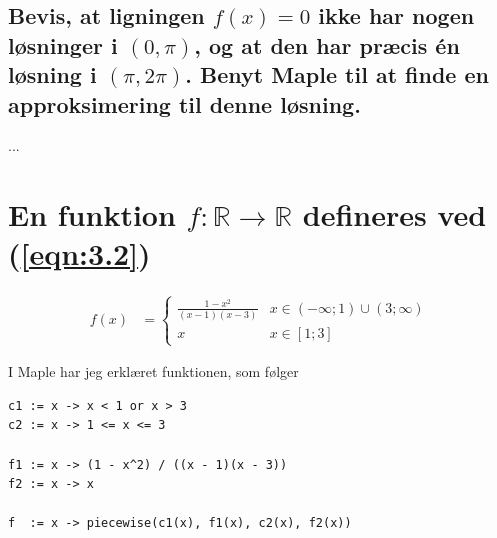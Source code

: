 \documentclass[11pt,a4paper]{article}
\newcommand{\eqnref}[1]{(\ref{eqn:#1})}
\begin{document}
\subsection
{
    \mdseries
    Bevis, at ligningen $f(x) = 0$ ikke har nogen løsninger i $(0, \pi)$, og
    at den har præcis én løsning i $(\pi,2\pi)$. Benyt Maple til at finde en
    approksimering til denne løsning.
}
...


\section
{
    \mdseries
    En funktion $f : \mathbb{R} \rightarrow \mathbb{R}$ defineres ved
    \eqnref{3.2}
}
\begin{align}
    f(x) &=
    \begin{cases}
        \frac{1 - x^2}{(x -1)(x - 3)} &x \in (-\infty;1) \cup (3;\infty) \\
        x &x \in [1;3]
    \end{cases}
    \label{eqn:3.2}
\end{align}

I Maple har jeg erklæret funktionen, som følger
\begin{lstlisting}
c1 := x -> x < 1 or x > 3
c2 := x -> 1 <= x <= 3

f1 := x -> (1 - x^2) / ((x - 1)(x - 3))
f2 := x -> x

f  := x -> piecewise(c1(x), f1(x), c2(x), f2(x))
\end{lstlisting}
\end{document}
